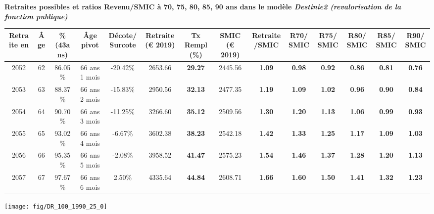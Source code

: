  \vspace{0.1cm} 
{\bf \noindent Retraites possibles et ratios Revenu/SMIC à 70, 75, 80, 85, 90 ans dans le modèle \emph{Destinie2 (revalorisation de la fonction publique)}}  
 
\begin{adjustbox}{max width=\textwidth} 
\begin{tabular}[htb]{|c|c||c|c|c||c|c||c|c||c|c|c|c|c|} 
\hline 
 Retraite en &  Âge &  \%(43ans) &  Âge pivot &  Décote/Surcote &  Retraite (\euro{} 2019) &  Tx Rempl(\%) &  SMIC (\euro{} 2019) &  Retraite/SMIC &  R70/SMIC &  R75/SMIC &  R80/SMIC &  R85/SMIC &  R90/SMIC \\ 
\hline \hline 
 2052 &  62 &  86.05\% &  66 ans 1 mois &  -20.42\% &  2653.66 &  {\bf 29.27} &  2445.56 &  {\bf 1.09} &  {\bf {\color{red} 0.98}} &  {\bf {\color{red} 0.92}} &  {\bf {\color{red} 0.86}} &  {\bf {\color{red} 0.81}} &  {\bf {\color{red} 0.76}} \\ 
\hline 
 2053 &  63 &  88.37\% &  66 ans 2 mois &  -15.83\% &  2950.56 &  {\bf 32.13} &  2477.35 &  {\bf 1.19} &  {\bf 1.09} &  {\bf 1.02} &  {\bf {\color{red} 0.96}} &  {\bf {\color{red} 0.90}} &  {\bf {\color{red} 0.84}} \\ 
\hline 
 2054 &  64 &  90.70\% &  66 ans 3 mois &  -11.25\% &  3266.60 &  {\bf 35.12} &  2509.56 &  {\bf 1.30} &  {\bf 1.20} &  {\bf 1.13} &  {\bf 1.06} &  {\bf {\color{red} 0.99}} &  {\bf {\color{red} 0.93}} \\ 
\hline 
 2055 &  65 &  93.02\% &  66 ans 4 mois &  -6.67\% &  3602.38 &  {\bf 38.23} &  2542.18 &  {\bf 1.42} &  {\bf 1.33} &  {\bf 1.25} &  {\bf 1.17} &  {\bf 1.09} &  {\bf 1.03} \\ 
\hline 
 2056 &  66 &  95.35\% &  66 ans 5 mois &  -2.08\% &  3958.52 &  {\bf 41.47} &  2575.23 &  {\bf 1.54} &  {\bf 1.46} &  {\bf 1.37} &  {\bf 1.28} &  {\bf 1.20} &  {\bf 1.13} \\ 
\hline 
 2057 &  67 &  97.67\% &  66 ans 6 mois &  2.50\% &  4335.64 &  {\bf 44.84} &  2608.71 &  {\bf 1.66} &  {\bf 1.60} &  {\bf 1.50} &  {\bf 1.41} &  {\bf 1.32} &  {\bf 1.23} \\ 
\hline 
\hline 
\end{tabular} 
\end{adjustbox} 
 
 \vspace{0.1cm} 

 {\hspace{-2.2cm}\texttt{[image: fig/DR\_100\_1990\_25\_0]}} 

